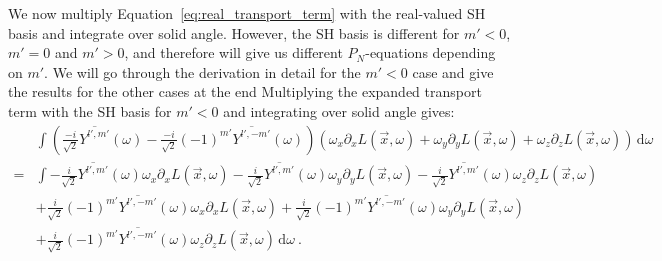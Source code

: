 \documentclass{egpubl}
\newcommand{\ud}{\,\mathrm{d}} %
\begin{document}
We now multiply Equation~\ref{eq:real_transport_term} with the real-valued SH basis and integrate over solid angle. However, the SH basis is different for $m'<0$, $m'=0$ and $m'>0$, and therefore will give us different $P_N$-equations depending on $m'$. We will go through the derivation in detail for the $m'<0$ case and give the results for the other cases at the end Multiplying the expanded transport term with the SH basis for $m'<0$ and integrating over solid angle gives:
\begin{align*}
&\int{\left(\frac{-i}{\sqrt{2}}\overline{Y^{l', m'}}(\omega )-\frac{-i}{\sqrt{2}}\left({-1}\right)^{m'}\overline{Y^{l', -m'}}(\omega )\right)\left(\omega_{x}\partial_xL\left (\vec{x} ,\omega \right )+\omega_{y}\partial_yL\left (\vec{x} ,\omega \right )+\omega_{z}\partial_zL\left (\vec{x} ,\omega \right )\right)\ud\omega}
\\
=&
\int-\frac{i}{\sqrt{2}}\overline{Y^{l', m'}}(\omega )\omega_{x}\partial_xL\left (\vec{x} ,\omega \right )-\frac{i}{\sqrt{2}}\overline{Y^{l', m'}}(\omega )\omega_{y}\partial_yL\left (\vec{x} ,\omega \right )-\frac{i}{\sqrt{2}}\overline{Y^{l', m'}}(\omega )\omega_{z}\partial_zL\left (\vec{x} ,\omega \right )
\\&
+\frac{i}{\sqrt{2}}\left({-1}\right)^{m'}\overline{Y^{l', -m'}}(\omega )\omega_{x}\partial_xL\left (\vec{x} ,\omega \right )+\frac{i}{\sqrt{2}}\left({-1}\right)^{m'}\overline{Y^{l', -m'}}(\omega )\omega_{y}\partial_yL\left (\vec{x} ,\omega \right )
\\&
+\frac{i}{\sqrt{2}}\left({-1}\right)^{m'}\overline{Y^{l', -m'}}(\omega )\omega_{z}\partial_zL\left (\vec{x} ,\omega \right )\ud\omega \ .
\end{align*}
\end{document}
